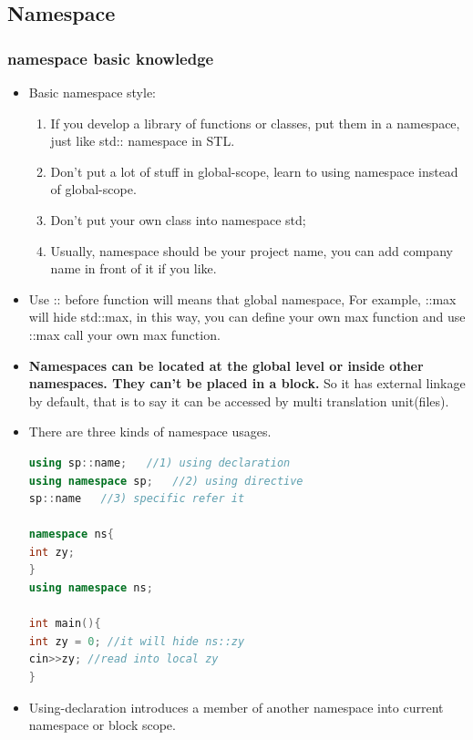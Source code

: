 \documentclass[a4paper,12pt,twoside]{book}
\begin{document}
\subsection{Namespace}
\subsubsection{namespace basic knowledge}
\begin{itemize}

\item Basic namespace style:
\begin{enumerate}
\item If you develop a library of functions or classes, put them in a namespace, just like std:: namespace in STL.

\item Don't put a lot of stuff in global-scope, learn to using namespace instead of global-scope.

\item Don't put your own class into namespace std;

\item Usually, namespace should be your project name, you can add company name in front of it if you like.
\end{enumerate}


\item Use :: before function will means that global namespace, For example, ::max will hide std::max, in this way, you can define your own max function and use ::max call your own max function. 

\item \textbf{Namespaces can be located at the global level or inside other namespaces. They can't be placed in a block.} So it has external linkage by default, that is to say it can be accessed by multi translation unit(files).


\item There are three kinds of namespace usages.
\begin{lstlisting}[frame=single, language=c++]
using sp::name;   //1) using declaration
using namespace sp;   //2) using directive
sp::name   //3) specific refer it

namespace ns{
int zy;
}
using namespace ns;

int main(){
int zy = 0; //it will hide ns::zy
cin>>zy; //read into local zy
}
\end{lstlisting}

\item Using-declaration introduces a member of another namespace into current namespace or block scope.


\end{itemize}
\end{document}
